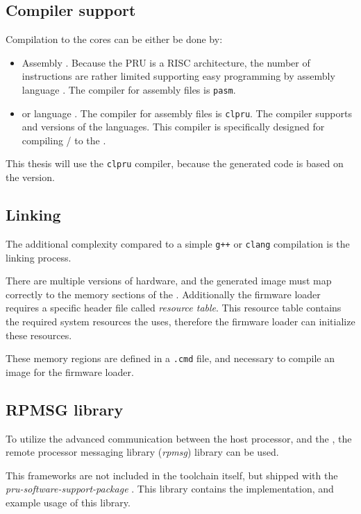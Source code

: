 \subsection{Compiler support}

Compilation to the \pru{} cores can be either be done by:
\begin{itemize}
	\item Assembly \citep{PRU_ASM}. Because the PRU is a RISC architecture, the number of instructions are rather limited supporting easy programming by assembly language \citep{PRU_ASM_INSTR}. The compiler for assembly files is \verb+pasm+.
	\item \cpl{} or \cpp{} language \citep{PRU_C_CPP}. The compiler for assembly files is \verb+clpru+. The compiler supports  and  versions of the languages. This compiler is specifically designed for compiling \cpl{}/\cpp{} to the \pru.
\end{itemize}
This thesis will use the \verb+clpru+ compiler, because the generated code is based on the  version.

\subsection{Linking}
\label{subs:linking}

The additional complexity compared to a simple \verb/g++/ or \verb/clang/ compilation is the linking process.

There are multiple versions of \pru{} hardware, and the generated image must map correctly to the memory sections of the \pru. Additionally the firmware loader requires a specific header file called \emph{resource table}. This resource table contains the required system resources the \pru{} uses, therefore the firmware loader can initialize these resources.

These memory regions are defined in a \verb+.cmd+ file, and necessary to compile an \elf{} image for the firmware loader.

\subsection{RPMSG library}

To utilize the advanced communication between the host processor, and the \pru, the remote processor messaging library (\emph{rpmsg}) library can be used.

This frameworks are not included in the \pru{} \cpp{} toolchain itself, but shipped with the \emph{pru-software-support-package} \citep{TI_PRUSS_REPO}. This library contains the implementation, and example usage of this library.

